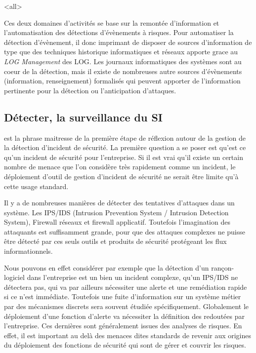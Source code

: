\mode<all>{}

Ces deux domaines d'activités se base sur la remontée d'information et l'automatisation des détections d'évènements à risques.  Pour automatiser la détection d'évènement, il donc imprimant de disposer de sources d'information de type  que des techniques historique informatiques et réseaux  apporte grace au \textit{LOG  Management} des LOG. Les journaux informatiques des systèmes sont au coeur de la détection, mais il existe de nombreuses autre sources d'évènements (information, renseignement) formalisés qui peuvent apporter de l'information pertinente pour la détection ou l'anticipation d'attaques.

\subsection{Détecter, la surveillance du SI}


 est la phrase maitresse de la première étape de réflexion autour de la gestion de la détection d'incident de sécurité.
La première question a se poser est qu'est ce qu'un incident de sécurité pour l'entreprise. Si il est vrai qu'il existe un certain nombre de menace  que l'on considère très rapidement comme un incident, le déploiement d'outil de gestion d'incident de sécurité ne serait être limite qu'à cette usage standard.

Il y a de nombreuses manières de détecter des tentatives d'attaques dans un système. Les IPS/IDS (Intrusion Prevention System / Intrusion Detection System), Firewall réseaux et firewall applicatif. Toutefois l'imagination des attaquants est suffisamment grande, pour que des attaques complexes ne puisse être détecté par ces seuls outils et produits de sécurité protégeant les flux informationnels.

Nous pouvons en effet considérer par exemple que la détection d'un rançon-logiciel dans l'entreprise est un bien un incident complexe, qu'un IPS/IDS ne détectera pas,  qui va par ailleurs nécessiter une alerte et une remédiation rapide si ce n'est immédiate.
Toutefois une fuite d'information sur un système métier par des mécanismes discrets sera souvent étudiée spécifiquement.
Globalement le déploiement d'une fonction d'alerte va nécessiter la définition des  redoutées par l'entreprise. 
Ces dernières sont généralement issues des analyses de risques.
En effet, il est important au delà des menaces dites standards de revenir aux origines du déploiement des fonctions de sécurité qui sont de gérer et couvrir les risques.

